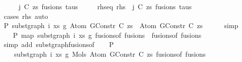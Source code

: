 \begin{isabellebody}
%
\isadelimproof
%
\endisadelimproof
%
\isatagproof
{}\isamarkupfalse%
\ {\isacharminus}{\kern0pt}\isanewline
\ \ \isamarkupfalse%
\ j\ C\ zs\ fusions\ taus\isanewline
\ \ \ \ \ rhs{\isacharunderscore}{\kern0pt}eq{\isacharcolon}{\kern0pt}\ {\isachardoublequoteopen}rhs\ {\isacharequal}{\kern0pt}\ {\isacharparenleft}{\kern0pt}j{\isacharcomma}{\kern0pt}\ {\isacharparenleft}{\kern0pt}C{\isacharcomma}{\kern0pt}\ zs{\isacharparenright}{\kern0pt}{\isacharcomma}{\kern0pt}\ fusions{\isacharcomma}{\kern0pt}\ taus{\isacharparenright}{\kern0pt}{\isachardoublequoteclose}\isanewline
\ \ \ \ \isamarkupfalse%
\ {\isacharparenleft}{\kern0pt}cases\ rhs{\isacharparenright}{\kern0pt}\ auto\isanewline
\isanewline
\ \ \isamarkupfalse%
\ P{}{\isacharcolon}{\kern0pt}\ {\isachardoublequoteopen}subst{\isacharunderscore}{\kern0pt}graph\ i\ xs\ g{}\ {\isacharparenleft}{\kern0pt}Atom\ {\isacharparenleft}{\kern0pt}GConstr\ C{\isacharparenright}{\kern0pt}\ zs{\isacharparenright}{\kern0pt}\ {\isacharequal}{\kern0pt}\ Atom\ {\isacharparenleft}{\kern0pt}GConstr\ C{\isacharparenright}{\kern0pt}\ zs{\isachardoublequoteclose}\isanewline
\ \ \ \ \isamarkupfalse%
\ simp\isanewline
\isanewline
\ \ \isamarkupfalse%
\ P{}{\isacharcolon}{\kern0pt}\ {\isachardoublequoteopen}map\ {\isacharparenleft}{\kern0pt}subst{\isacharunderscore}{\kern0pt}graph\ i\ xs\ g{}{\isacharparenright}{\kern0pt}\ {\isacharparenleft}{\kern0pt}fusions{\isacharunderscore}{\kern0pt}of\ fusions{\isacharparenright}{\kern0pt}\ {\isacharequal}{\kern0pt}\ fusions{\isacharunderscore}{\kern0pt}of\ fusions{\isachardoublequoteclose}\isanewline
\ \ \ \ \isamarkupfalse%
\ {\isacharparenleft}{\kern0pt}simp\ add{\isacharcolon}{\kern0pt}\ subst{\isacharunderscore}{\kern0pt}graph{\isacharunderscore}{\kern0pt}fusions{\isacharunderscore}{\kern0pt}of{\isacharparenright}{\kern0pt}\isanewline
\isanewline
\ \ \isamarkupfalse%
\ P{}{\isacharcolon}{\kern0pt}\isanewline
\ \ \ \ {\isachardoublequoteopen}subst{\isacharunderscore}{\kern0pt}graph\ i\ xs\ g{}\ {\isacharparenleft}{\kern0pt}Mols{}\ {\isacharparenleft}{\kern0pt}Atom\ {\isacharparenleft}{\kern0pt}GConstr\ C{\isacharparenright}{\kern0pt}\ zs{\isacharparenright}{\kern0pt}\ {\isacharparenleft}{\kern0pt}fusions{\isacharunderscore}{\kern0pt}of\ fusions{\isacharparenright}{\kern0pt}{\isacharparenright}{\kern0pt}\ {\isacharequal}{\kern0pt}\isanewline

\end{isabellebody}
